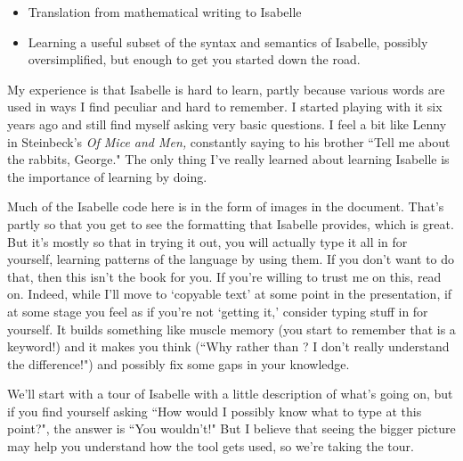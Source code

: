 \begin{itemize}
\item Translation from mathematical writing to Isabelle

\item  Learning a useful subset of the syntax and semantics of Isabelle, possibly oversimplified, but enough to get you started down the road. 
\end{itemize}

My experience is that Isabelle is hard to learn, partly because various words are used in ways I find peculiar and hard to remember. I started playing with it six years ago and still find myself asking very basic questions. I feel a bit like Lenny in Steinbeck's \emph{Of Mice and Men,} constantly saying to his brother ``Tell me about the rabbits, George." The only thing I've really learned about learning Isabelle is the importance of learning by doing. 

Much of the Isabelle code here is in the form of images in the document. That's partly so that you get to see the formatting that Isabelle provides, which is great. But it's mostly so that in trying it out, you will actually type it all in for yourself, learning patterns of the language by using them. If you don't want to do that, then this isn't the book for you. If you're willing to trust me on this, read on. Indeed, while I'll move to `copyable text' at some point in the presentation, if at some stage you feel as if you're not `getting it,' consider typing stuff in for yourself. It builds something like muscle memory (you start to remember that  is a keyword!) and it makes you think (``Why   rather than ? I don't really understand the difference!") and possibly fix some gaps in your knowledge. 

We'll start with a tour of Isabelle with a little description of what's going on, but if you find yourself asking ``How would I possibly know what to type at this point?", the answer is ``You wouldn't!" But I believe that seeing the bigger picture may help you understand how the tool gets used, so we're taking the tour. 

